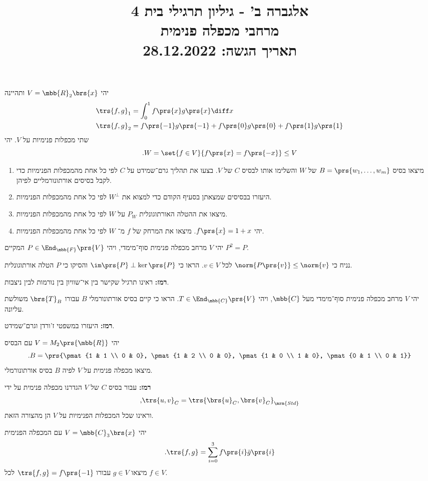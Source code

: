 \documentclass[a4paper,10pt,twoside,openany]{article}
\title{
אלגברה ב' - גיליון תרגילי בית 4 \\
מרחבי מכפלה פנימית
\\
\vspace{1cm}
\large{תאריך הגשה: 28.12.2022}
}
\date{}
\begin{document}
\maketitle

\begin{exercise}%
יהי
$V = \mbb{R}_2\brs{x}$
ותהיינה
\begin{align*}
\trs{f,g}_1 &= \int_0^1 f\prs{x} g\prs{x} \diff x \\
\trs{f,g}_2 &= f\prs{-1} g\prs{-1} + f\prs{0} g\prs{0} + f\prs{1} g\prs{1}
\end{align*}
שתי מכפלות פנימיות על
$V$.
יהי
\[\text{.} W = \set{f \in V}{f\prs{x} = f\prs{-x}} \leq V\]
\begin{enumerate}
\item 
מיצאו בסיס
$B = \prs{w_1, \ldots, w_m}$
של
$W$
והשלימו אותו לבסיס
$C$
של
$V$.
בצעו את תהליך גרם־שמידט על
$C$
לפי כל אחת מהמכפלות הפנימיות כדי לקבל בסיסים אורתונורמליים לפיהן.

\item
היעזרו בבסיסים שמצאתן בסעיף הקודם כדי למצוא
את
$W^\perp$
לפי כל אחת מהמכפלות הפנימיות.

\item
מיצאו את ההטלה האורתוגונלית
$P_W$
על
$W$
לפי כל אחת מהמכפלות הפנימיות.

\item
יהי
$f\prs{x} = 1 + x$.
מיצאו את המרחק של
$f$
מ־%
$W$
לפי כל אחת מהמכפלות הפנימיות.
\end{enumerate}
\end{exercise}

\begin{exercise}%
יהי
$V$
מרחב מכפלה פנימית סוף־מימדי, ויהי
$P \in \End_{\mbb{F}}\prs{V}$
המקיים
$P^2 = P$.

נניח כי
$\norm{P\prs{v}} \leq \norm{v}$
לכל
$v \in V$.
הראו כי
$\im\prs{P} \perp \ker\prs{P}$
והסיקו כי
$P$
הטלה אורתוגונלית.

\textbf{רמז:}
ראינו תרגיל שקישר בין אי־שוויון בין נורמות לבין ניצבות.
\end{exercise}

\begin{exercise}%
יהי
$V$
מרחב מכפלה פנימית סוף־מימדי מעל
$\mbb{C}$,
ויהי
$T \in \End_{\mbb{C}}\prs{V}$.
הראו כי קיים בסיס אורתונורמלי
$B$
עבורו
$\brs{T}_B$
משולשת עליונה.

\textbf{רמז:}
היעזרו במשפטי ז'ורדן וגרם־שמידט.
\end{exercise}

\begin{exercise}%
יהי
$V = M_2\prs{\mbb{R}}$
עם הבסיס
\[\text{.} B = \prs{\pmat{1 & 1 \\ 0 & 0}, \pmat{1 & 2 \\ 0 & 0}, \pmat{1 & 0 \\ 1 & 0}, \pmat{0 & 1 \\ 0 & 1}}\]
מיצאו מכפלה פנימית על
$V$
לפיה
$B$
בסיס אורתונורמלי.

\textbf{רמז:}
עבור בסיס
$C$
של
$V$
הגדרנו מכפלה פנימית על ידי
\[\text{,} \trs{u,v}_C = \trs{\brs{u}_C, \brs{v}_C}_{\mrm{Std}}\]
וראינו שכל המכפלות הפנימיות על
$V$
הן מהצורה הזאת.
\end{exercise}

\begin{exercise}%
יהי
$V = \mbb{C}_3\brs{x}$
עם המכפלה הפנימית
\[\text{.} \trs{f,g} = \sum_{i = 0}^{3} f\prs{i} \bar{g}\prs{i}\]
מיצאו
$g \in V$
עבורו
$\trs{f,g} = f\prs{-1}$
לכל
$f \in V$.
\end{exercise}
\end{document}
